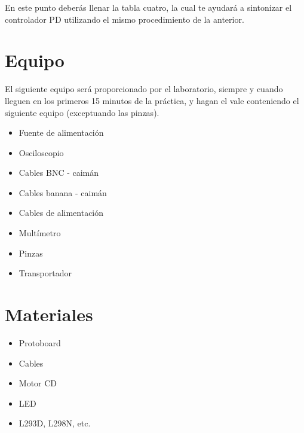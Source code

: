 		\begin{fullwidth}
			\begin{multicols}{2}
				
			\end{multicols}
		\end{fullwidth}

		En este punto deberás llenar la tabla cuatro, la cual te ayudará a sintonizar el controlador PD utilizando el mismo procedimiento de la anterior.
		\newpage


\section{Equipo}

	El siguiente equipo será proporcionado por el laboratorio, siempre y cuando lleguen en los primeros 15 minutos de la práctica, y hagan el vale conteniendo el siguiente equipo (exceptuando las pinzas).

	\begin{itemize}
		\item Fuente de alimentación
		\item Osciloscopio
		\item Cables BNC - caimán
		\item Cables banana - caimán
		\item Cables de alimentación
		\item Multímetro
		\item Pinzas
		\item Transportador
	\end{itemize}


\section{Materiales}

	\begin{itemize}
		\item Protoboard
		\item Cables
		\item Motor CD
		\item LED
		\item L293D, L298N, etc.
	\end{itemize}

